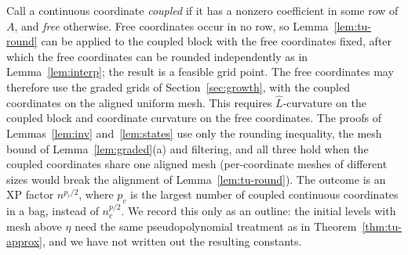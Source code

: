 \begin{remark}\label{rem:tu-hybrid}
Call a continuous coordinate \emph{coupled} if it has a nonzero coefficient in
some row of $A$, and \emph{free} otherwise. Free coordinates occur in no
row, so Lemma~\ref{lem:tu-round} can be applied to the coupled block with the
free coordinates fixed, after which the free coordinates can be rounded
independently as in Lemma~\ref{lem:interp}; the result is a feasible grid
point. The free coordinates may therefore use the graded grids of
Section~\ref{sec:growth}, with the coupled coordinates on the aligned
uniform mesh. This requires $\hat L$-curvature on the coupled block and
coordinate curvature on the free coordinates. The proofs of
Lemmas~\ref{lem:inv} and~\ref{lem:states} use only the rounding inequality,
the mesh bound of Lemma~\ref{lem:graded}(a) and filtering, and all three hold
when the coupled coordinates share one aligned mesh (per-coordinate meshes of
different sizes would break the alignment of Lemma~\ref{lem:tu-round}).
The outcome is an XP factor $n^{p_c/2}$, where $p_c$ is the largest number of
coupled continuous coordinates in a bag, instead of $n_c^{p/2}$. We record this
only as an outline: the initial levels with mesh above $\eta$ need the same
pseudopolynomial treatment as in Theorem~\ref{thm:tu-approx}, and we have not
written out the resulting constants.
\end{remark}

